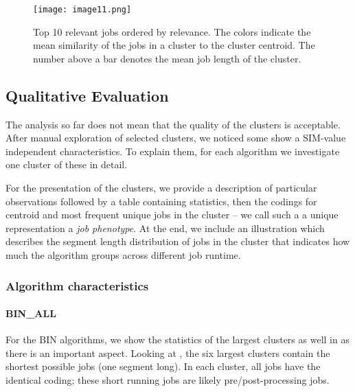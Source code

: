 \documentclass{jhps}
\begin{document}

\begin{figure}
  \centering
   \texttt{[image: image11.png]}
   \caption{Top 10 relevant jobs ordered by relevance.
   The colors indicate the mean similarity of the jobs in a cluster to the cluster centroid.
   The number above a bar denotes the mean job length of the cluster.}
   \label{fig:top10_relevant_jobs}
\end{figure}

\subsection{Qualitative Evaluation}
The analysis so far does not mean that the quality of the clusters is acceptable.
After manual exploration of selected clusters, we noticed some show a SIM-value independent characteristics.
To explain them, for each algorithm we investigate one cluster of these in detail.

For the presentation of the clusters, we provide a description of particular observations followed by a table containing statistics, then the codings for centroid and most frequent unique jobs in the cluster -- we call such a a unique representation a \textit{job phenotype}.
At the end, we include an illustration which describes the segment length distribution of jobs in the cluster that indicates how much the algorithm groups across different job runtime.

\subsubsection{Algorithm characteristics}
\paragraph{BIN\_ALL}
For the BIN algorithms, we show the statistics of the largest clusters as well in  as there is an important aspect.
Looking at , the six largest clusters contain the shortest possible jobs (one segment long).
In each cluster, all jobs have the identical coding; these short running jobs are likely pre/post-processing jobs.
\end{document}
